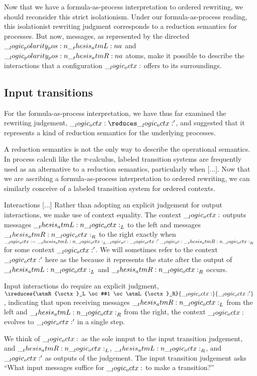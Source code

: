 Now that we have a formula-as-process interpretation to ordered rewriting, we should reconsider this strict isolationism.
Under our formula-as-process reading, this isolationist rewriting judgment corresponds to a reduction semantics for processes.
But now, messages, as represented by the directed $\__logic_polarity_pos:n {\__thesis_atmL:n {a}}$ and $\__logic_polarity_pos:n {\__thesis_atmR:n {a}}$ atoms, make it possible to describe the interactions that a configuration $\__logic_octx:$ offers to its surroundings. 

\clearpage
\subsection{Input transitions}


For the formula-as-process interpretation, we have thus far examined the rewriting judgement, $\octx \reduces \octx'$, and suggested that it represents a kind of reduction semantics for the underlying processes.

A reduction semantics is not the only way to describe the operational semantics.
In process calculi like the $\pi$-calculus, labeled transition systems are frequently used as an alternative to a reduction semantics, particularly when [...].
Now that we are ascribing a formula-as-process interpretation to ordered rewriting, we can similarly conceive of a labeled transition system for ordered contexts.

Interactions [...]
Rather than adopting an explicit judgement for output interactions, we make use of context equality. 
The context $\__logic_octx:$ outputs messages $\__thesis_atmL:n {\__logic_octx:}_L$ to the left and messages $\__thesis_atmR:n {\__logic_octx:}_R$ to the right exactly when $\__logic_octx: = \__thesis_atmL:n {\__logic_octx:}_L \__logic_oc: \__logic_octx:' \__logic_oc: \__thesis_atmR:n {\__logic_octx:}_R$ for some context $\__logic_octx:'$.
We will sometimes refer to the context $\__logic_octx:'$ here as the  because it represents the state after the output of $\__thesis_atmL:n {\__logic_octx:}_L$ and $\__thesis_atmR:n {\__logic_octx:}_R$ occurs.

Input interactions do require an explicit judgment, $\ireduces{\atmR{\octx}_L \oc #1 \oc \atmL{\octx}_R}{\octx}{\octx'}$, indicating that upon receiving messages $\__thesis_atmR:n {\__logic_octx:}_L$ from the left and $\__thesis_atmL:n {\__logic_octx:}_R$ from the right, the context $\__logic_octx:$ evolves to $\__logic_octx:'$ in a single step.

We think of $\__logic_octx:$ as the sole innput to the input transition judgement, and $\__thesis_atmR:n {\__logic_octx:}_L$, $\__thesis_atmL:n {\__logic_octx:}_R$, and $\__logic_octx:'$ as outputs of the judgement.
The input transition judgement asks \enquote{What input messages suffice for $\__logic_octx:$ to make a transition?}

